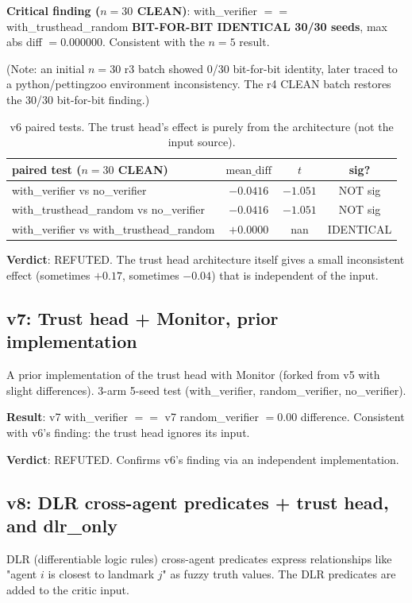 \documentclass[11pt]{article}
\begin{document}
\textbf{Critical finding ($n=30$ CLEAN)}: with\_verifier $==$
with\_trusthead\_random \textbf{BIT-FOR-BIT IDENTICAL 30/30 seeds},
max abs diff $= 0.000000$. Consistent with the $n=5$ result.

(Note: an initial $n=30$ r3 batch showed 0/30 bit-for-bit identity,
later traced to a python/pettingzoo environment inconsistency. The
r4 CLEAN batch restores the 30/30 bit-for-bit finding.)

\begin{table}[h]
\centering
\begin{tabular}{lccc}
\toprule
paired test ($n=30$ CLEAN) & $\text{mean\_diff}$ & $t$ & sig? \\
\midrule
with\_verifier vs no\_verifier & $-0.0416$ & $-1.051$ & NOT sig \\
with\_trusthead\_random vs no\_verifier & $-0.0416$ & $-1.051$ & NOT sig \\
with\_verifier vs with\_trusthead\_random & $+0.0000$ & nan & IDENTICAL \\
\bottomrule
\end{tabular}
\caption{v6 paired tests. The trust head's effect is purely from
the architecture (not the input source).}
\end{table}

\textbf{Verdict}: REFUTED. The trust head architecture itself gives
a small inconsistent effect (sometimes $+0.17$, sometimes $-0.04$)
that is independent of the input.

\subsection{v7: Trust head + Monitor, prior implementation}

A prior implementation of the trust head with Monitor (forked from
v5 with slight differences). 3-arm 5-seed test (with\_verifier,
random\_verifier, no\_verifier).

\textbf{Result}: v7 with\_verifier $==$ v7 random\_verifier $= 0.00$
difference. Consistent with v6's finding: the trust head ignores
its input.

\textbf{Verdict}: REFUTED. Confirms v6's finding via an independent
implementation.

\subsection{v8: DLR cross-agent predicates + trust head, and dlr\_only}

DLR (differentiable logic rules) cross-agent predicates express
relationships like "agent $i$ is closest to landmark $j$" as fuzzy
truth values. The DLR predicates are added to the critic input.
\end{document}
